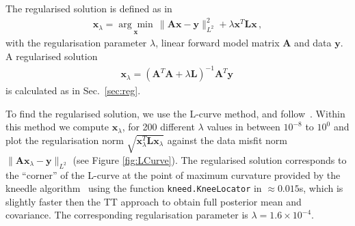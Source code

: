 The regularised solution is defined as in~\cite{hansen2010discrete, fox2016fast} 
\begin{align}
	\bm{x}_{\lambda} =\underset{ \bm{x}}{\arg \min}\,  \lVert \bm{A}\bm{x} - \bm{y} \rVert_{L^2}^2 + \lambda \bm{x}^T \bm{L} \bm{x} \, ,
	\label{eq:XLam}
\end{align}
with the regularisation parameter $\lambda$, linear forward model matrix $\bm{A}$ and data $\bm{y}$.
A regularised solution
\begin{align}
	\bm{x}_{\lambda} = (\bm{A}^T\bm{A} + \lambda \bm{L} )^{-1} \bm{A}^T \bm{y} \label{eq:xLam} \, 
\end{align}
is calculated as in Sec.~\ref{sec:reg}.


To find the regularised solution, we use the L-curve method, and follow~\cite{hansen1993use}.
Within this method we compute $\bm{x}_\lambda$, for 200 different $\lambda$ values in between $10^{-8}$ to $10^{0}$ and plot the regularisation norm $\sqrt{\bm{x}_\lambda^T\mathbf{L} \bm{x}_\lambda}$ against the data misfit norm $\lVert \bm{A}\bm{x}_\lambda - \bm{y} \rVert_{L^2}$ (see Figure \ref{fig:LCurve}). 
The regularised solution corresponds to the ``corner'' of the L-curve at the point of maximum curvature provided by the kneedle algorithm~\cite{satopaa2011kneedle} using the function \texttt{kneed.KneeLocator} in $\approx 0.015$s, which is slightly faster then the TT approach to obtain full posterior mean and covariance.
The corresponding regularisation parameter is $\lambda = 1.6 \times 10^{-4}$.

